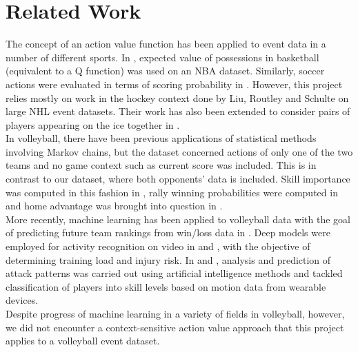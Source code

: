 \documentclass{sfuthesis}
\begin{document}
	\section{Related Work}
	The concept of an action value function has been applied to event data in a number of different sports. In \cite{cervone2014pointwise}, expected value of possessions in basketball (equivalent to a Q function) was used on an NBA dataset. Similarly, soccer actions were evaluated in terms of scoring probability in \cite{decroos2019actions}. However, this project relies mostly on work in the hockey context done by Liu, Routley and Schulte \cite{liu2018deep, routley2015markov, schulte2017markov, schulte2017apples} on large NHL event datasets. Their work has also been extended to consider pairs of players appearing on the ice together in \cite{Ljung2019}.\\
	In volleyball, there have been previous applications of statistical methods involving Markov chains, but the dataset concerned actions of only one of the two teams and no game context such as current score was included. This is in contrast to our dataset, where both opponents' data is included. Skill importance was computed in this fashion in \cite{miskin2010skill}, rally winning probabilities were computed in \cite{florence2008skill} and home advantage was brought into question in \cite{alexandros2012existence}.\\
	More recently, machine learning has been applied to volleyball data with the goal of predicting future team rankings from win/loss data in \cite{tumer2017prediction}.  Deep models were employed for activity recognition on video in \cite{ibrahim2018deep} and \cite{kautz2017activity}, with the objective of determining training load and injury risk. In \cite{wenninger2020performance} and \cite{van2016analyzing}, analysis and prediction of attack patterns was carried out using artificial intelligence methods and \cite{wang2018volleyball} tackled classification of players into skill levels based on motion data from wearable devices.\\
	Despite progress of machine learning in a variety of fields in volleyball, however, we did not encounter a context-sensitive action value approach that this project applies to a volleyball event dataset.
\end{document}
